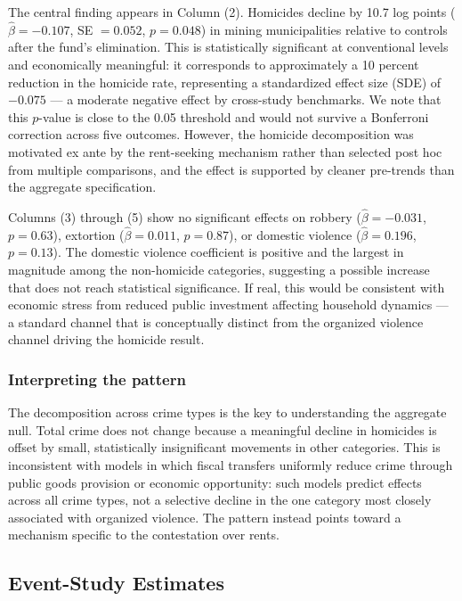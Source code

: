 \documentclass[12pt]{article}
\begin{document}
The central finding appears in Column (2). Homicides decline by 10.7 log points ($\hat{\beta} = -0.107$, SE $= 0.052$, $p = 0.048$) in mining municipalities relative to controls after the fund's elimination. This is statistically significant at conventional levels and economically meaningful: it corresponds to approximately a 10 percent reduction in the homicide rate, representing a standardized effect size (SDE) of $-0.075$ --- a moderate negative effect by cross-study benchmarks. We note that this $p$-value is close to the 0.05 threshold and would not survive a Bonferroni correction across five outcomes. However, the homicide decomposition was motivated ex ante by the rent-seeking mechanism rather than selected post hoc from multiple comparisons, and the effect is supported by cleaner pre-trends than the aggregate specification.

Columns (3) through (5) show no significant effects on robbery ($\hat{\beta} = -0.031$, $p = 0.63$), extortion ($\hat{\beta} = 0.011$, $p = 0.87$), or domestic violence ($\hat{\beta} = 0.196$, $p = 0.13$). The domestic violence coefficient is positive and the largest in magnitude among the non-homicide categories, suggesting a possible increase that does not reach statistical significance. If real, this would be consistent with economic stress from reduced public investment affecting household dynamics --- a standard channel that is conceptually distinct from the organized violence channel driving the homicide result.



\subsubsection*{Interpreting the pattern} The decomposition across crime types is the key to understanding the aggregate null. Total crime does not change because a meaningful decline in homicides is offset by small, statistically insignificant movements in other categories. This is inconsistent with models in which fiscal transfers uniformly reduce crime through public goods provision or economic opportunity: such models predict effects across all crime types, not a selective decline in the one category most closely associated with organized violence. The pattern instead points toward a mechanism specific to the contestation over rents.

\subsection{Event-Study Estimates}
\end{document}
